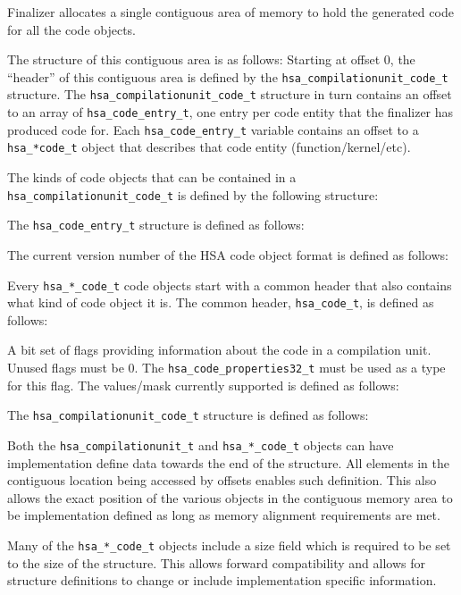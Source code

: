 Finalizer allocates a single contiguous area of memory to hold the
generated code for all the code objects.

The structure of this contiguous area is as follows: Starting at
offset 0, the ``header'' of this contiguous area is defined by the
\texttt{hsa\_compilationunit\_code\_t} structure. The
\texttt{hsa\_compilationunit\_code\_t} structure in turn contains
an offset to an array of \texttt{hsa\_code\_entry\_t}, one entry per
code entity that the finalizer has produced code for. Each
\texttt{hsa\_code\_entry\_t} variable contains an offset to a
\texttt{hsa\_*code\_t} object that describes that code entity
(function/kernel/etc).

The kinds of code objects that can be contained in a
\texttt{hsa\_compilationunit\_code\_t} is defined by the following
structure:


The \texttt{hsa\_code\_entry\_t} structure is defined as follows:


The current version number of the HSA code object
format is defined as follows:



Every \texttt{hsa\_*\_code\_t} code objects start with a common
header that also contains what kind of code object it is. The common
header, \texttt{hsa\_code\_t}, is defined as follows:


A bit set of flags providing information about the code in a
compilation unit. Unused flags must be 0. The
\texttt{hsa\_code\_properties32\_t} must be used as a type for this
flag. The values/mask currently supported is defined as follows:


The \texttt{hsa\_compilationunit\_code\_t} structure is defined as
follows:


Both the \texttt{hsa\_compilationunit\_t} and
\texttt{hsa\_*\_code\_t} objects can have implementation define data
towards the end of the structure. All elements in the contiguous
location being accessed by offsets enables such definition.  This
also allows the exact position of the various objects in the
contiguous memory area to be implementation defined as long as
memory alignment requirements are met.

Many of the \texttt{hsa\_*\_code\_t} objects include a size field
which is required to be set to the size of the structure. This
allows forward compatibility and allows for structure definitions to
change or include implementation specific information.

